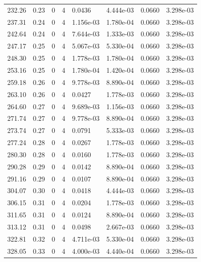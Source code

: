 \documentclass[preview]{standalone}
\begin{document}
{{{\begin{tabular}{L{1.2cm}C{1.2cm} C{0.3cm}C{0.5cm} C{1.4cm}C{1.4cm} C{1.4cm}C{1.4cm}}
  232.26  &  0.23  & 0     &  4 &  0.0436  & 4.444e-03  & 0.0660 &  3.298e-03   \\ 
  237.31  &  0.24  & 0     &  4 &  1.156e-03  & 1.780e-04  & 0.0660 &  3.298e-03   \\ 
  242.64  &  0.24  & 0     &  4 &  7.644e-03  & 1.333e-03  & 0.0660 &  3.298e-03   \\ 
  247.17  &  0.25  & 0     &  4 &  5.067e-03  & 5.330e-04  & 0.0660 &  3.298e-03   \\ 
  248.30  &  0.25  & 0     &  4 &  1.778e-03  & 1.780e-04  & 0.0660 &  3.298e-03   \\ 
  253.16  &  0.25  & 0     &  4 &  1.780e-04  & 1.420e-04  & 0.0660 &  3.298e-03   \\ 
  259.18  &  0.26  & 0     &  4 &  9.778e-03  & 8.890e-04  & 0.0660 &  3.298e-03   \\ 
  263.10  &  0.26  & 0     &  4 &  0.0427  & 1.778e-03  & 0.0660 &  3.298e-03   \\ 
  264.60  &  0.27  & 0     &  4 &  9.689e-03  & 1.156e-03  & 0.0660 &  3.298e-03   \\ 
  271.74  &  0.27  & 0     &  4 &  9.778e-03  & 8.890e-04  & 0.0660 &  3.298e-03   \\ 
  273.74  &  0.27  & 0     &  4 &  0.0791  & 5.333e-03  & 0.0660 &  3.298e-03   \\ 
  277.24  &  0.28  & 0     &  4 &  0.0267  & 1.778e-03  & 0.0660 &  3.298e-03   \\ 
  280.30  &  0.28  & 0     &  4 &  0.0160  & 1.778e-03  & 0.0660 &  3.298e-03   \\ 
  290.28  &  0.29  & 0     &  4 &  0.0142  & 8.890e-04  & 0.0660 &  3.298e-03   \\ 
  291.16  &  0.29  & 0     &  4 &  0.0107  & 8.890e-04  & 0.0660 &  3.298e-03   \\ 
  304.07  &  0.30  & 0     &  4 &  0.0418  & 4.444e-03  & 0.0660 &  3.298e-03   \\ 
  306.15  &  0.31  & 0     &  4 &  0.0204  & 1.778e-03  & 0.0660 &  3.298e-03   \\ 
  311.65  &  0.31  & 0     &  4 &  0.0124  & 8.890e-04  & 0.0660 &  3.298e-03   \\ 
  313.12  &  0.31  & 0     &  4 &  0.0498  & 2.667e-03  & 0.0660 &  3.298e-03   \\ 
  322.81  &  0.32  & 0     &  4 &  4.711e-03  & 5.330e-04  & 0.0660 &  3.298e-03   \\ 
  328.05  &  0.33  & 0     &  4 &  4.000e-03  & 4.440e-04  & 0.0660 &  3.298e-03   \\ 

\end{tabular}}}}
\end{document}
